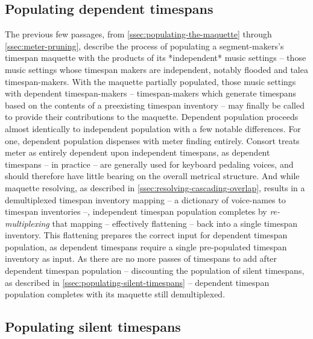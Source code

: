\subsection{Populating dependent timespans}
\label{ssec:populating-dependent-timespans}

The previous few passages, from \autoref{ssec:populating-the-maquette} through
\autoref*{ssec:meter-pruning}, describe the process of populating a
segment-makers's timespan maquette with the products of its *independent* music
settings -- those music settings whose timespan makers are independent, notably
flooded and talea timespan-makers. With the maquette partially populated, those
music settings with dependent timespan-makers -- timespan-makers which generate
timespans based on the contents of a preexisting timespan inventory -- may
finally be called to provide their contributions to the maquette. Dependent
population proceeds almost identically to independent population with a few
notable differences. For one, dependent population dispenses with meter finding
entirely. Consort treats meter as entirely dependent upon independent
timespans, as dependent timespans -- in practice -- are generally used for
keyboard pedaling voices, and should therefore have little bearing on the
overall metrical structure. And while maquette resolving, as described in
\autoref{ssec:resolving-cascading-overlap}, results in a demultiplexed timespan
inventory mapping -- a dictionary of voice-names to timespan inventories --,
independent timespan population completes by \emph{re-multiplexing} that
mapping -- effectively flattening -- back into a single timespan inventory.
This flattening prepares the correct input for dependent timespan population,
as dependent timespans require a single pre-populated timespan inventory as
input. As there are no more passes of timespans to add after dependent timespan
population -- discounting the population of silent timespans, as described in
\autoref{ssec:populating-silent-timespans} -- dependent timespan population
completes with its maquette still demultiplexed.

\subsection{Populating silent timespans}
\label{ssec:populating-silent-timespans}


